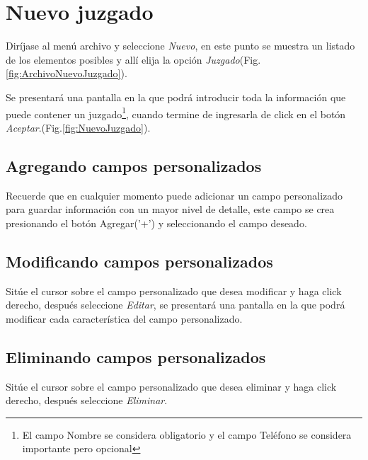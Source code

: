 \section{Nuevo juzgado}
\label{sec:nuevoJuzgado}
Dir\'ijase al men\'u archivo y seleccione \emph{Nuevo}, en este punto se muestra un listado de los elementos posibles y
all\'i elija la opci\'on \emph{Juzgado}(Fig.\ref{fig:ArchivoNuevoJuzgado}). 
  

Se presentar\'a una pantalla en la que podr\'a introducir toda la informaci\'on
que puede contener un juzgado\footnote{El campo Nombre se considera obligatorio y el campo Tel\'efono se
considera importante pero opcional},
cuando termine de ingresarla de click en el bot\'on \emph{Aceptar}.(Fig.\ref{fig:NuevoJuzgado}). 
  

\subsection{Agregando campos personalizados}
\label{sec:agregarCamposJuzgado}
Recuerde que en cualquier momento puede adicionar un campo personalizado para guardar informaci\'on con un mayor nivel de detalle, este campo se crea presionando el bot\'on Agregar('+') y seleccionando el campo deseado.

\subsection{Modificando campos personalizados}
\label{sec:modificarCamposJuzgado}
Sit\'ue el cursor sobre el campo personalizado que desea modificar y haga click derecho, despu\'es seleccione \emph{Editar},
se presentar\'a una pantalla en la que podr\'a modificar cada caracter\'istica
del campo personalizado.

\subsection{Eliminando campos personalizados}
\label{sec:eliminarCamposJuzgado}
Sit\'ue el cursor sobre el campo personalizado que desea eliminar y haga click derecho, despu\'es seleccione \emph{Eliminar}.